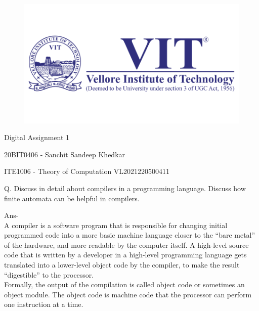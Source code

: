 \documentclass[12pt]{article}
\begin{document}
\begin{titlepage}
\NoBgThispage
   \begin{center}
        \begin{figure}[h] %
        \centering
        \includegraphics[width=15cm]{1583124354phpJTtnK5.png}
        \end{figure}

        \Huge{Digital Assignment 1}

        \vspace{0.5cm}
        \LARGE{20BIT0406 - Sanchit Sandeep Khedkar}
       
        \vspace{2.5 cm}

        \vspace{0.25 cm}
        \Large{ITE1006 - Theory of Computation}
        \large{VL2021220500411}
       

       \vfill
    \end{center}
\end{titlepage}
\newpage
Q. Discuss in detail about compilers in a programming language. Discuss how finite automata can be helpful in compilers.
\par
Ans-\\
A compiler is a software program that is responsible for changing initial programmed code into a more basic machine language closer to the “bare metal” of the hardware, and more readable by the computer itself. A high-level source code that is written by a developer in a high-level programming language gets translated into a lower-level object code by the compiler, to make the result “digestible” to the processor.
\\
Formally, the output of the compilation is called object code or sometimes an object module. The object code is machine code that the processor can perform one instruction at a time.
\end{document}
